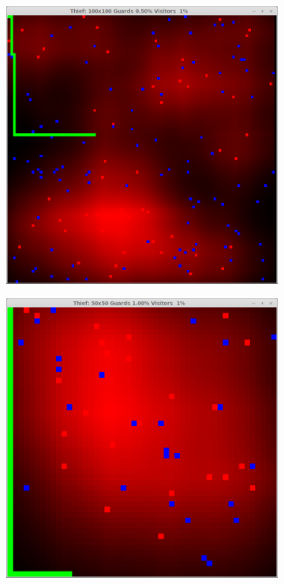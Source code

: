 \documentclass[12pt]{article}
\begin{document}
\begin{figure}
\begin{subfigure}[]{0.5\textwidth}
\includegraphics[width=\textwidth,keepaspectratio=true]{demo1.png}
\end{subfigure}
\begin{subfigure}[]{0.5\textwidth}
\includegraphics[width=\textwidth,keepaspectratio=true]{demo2.png}

\end{subfigure}
\end{figure}
\end{document}
